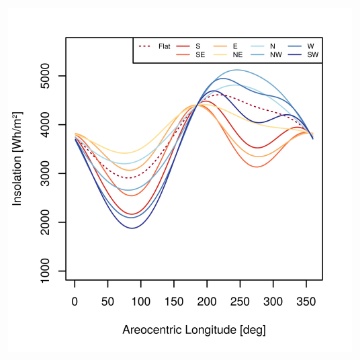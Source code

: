 \begin{figure}[h]
\captionsetup[subfigure]{justification=centering}
\vspace{-2ex}
\centering
    \setlength{\subfigureWidth}{0.50\textwidth}
    \setlength{\graphicsHeight}{80mm}
    \hypersetup{hidelinks=true}%
    \begin{subfigure}[t]{\subfigureWidth}
        \centering
            \includegraphics[height=\graphicsHeight]{sections/appendix/optimal-angles/plots/iani-chaos-tau-04-and-beta-optimal-based-on-direct-beam-irradiance-at-noon.png}
            \label{fig:sub:optimal-angles-iani-chaos-based-on-irradiance}
    \end{subfigure}\hfill
    \begin{subfigure}[t]{\subfigureWidth}
        \centering

\end{subfigure}
\end{figure}
